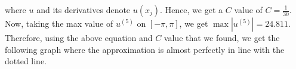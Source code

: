 \begin{solution}
    where $u$ and its derivatives denote $u(x_j)$. Hence, we get a $C$ value of $C=\frac{1}{30}$. Now,
    taking the max value of $u^{(5)}$ on $[-\pi,\pi]$, we get $\max|u^{(5)}|=24.811$. Therefore, using
    the above equation and $C$ value that we found, we get the following graph where the approximation
    is almost perfectly in line with the dotted line.


\end{solution}

\newpage

\newpage